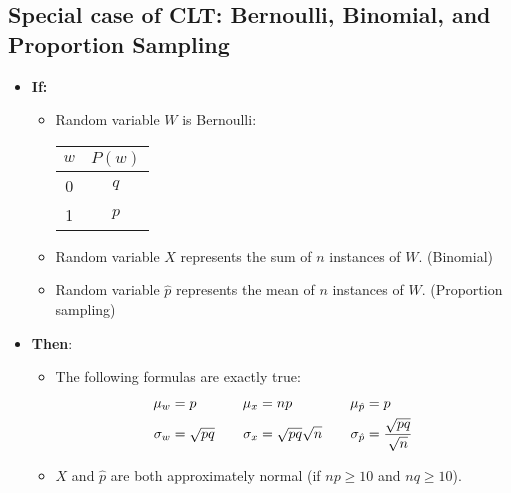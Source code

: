 \documentclass[12pt]{article}
\begin{document}
\subsection*{Special case of CLT: Bernoulli, Binomial, and Proportion Sampling}
\begin{itemize}
\item {\bf If:}
\begin{itemize}
\item Random variable $W$ is Bernoulli:
\begin{center}
\begin{tabular}{|c|c|}\hline
$w$ & $P(w)$ \\ \hline
0 & $q$ \\
1 & $p$ \\ \hline
\end{tabular}
\end{center} 
\item Random variable $X$ represents the sum of $n$ instances of $W$. (Binomial)
\item Random variable $\hat{p}$ represents the mean of $n$ instances of $W$. (Proportion sampling) 
\end{itemize}
\item {\bf Then}:
\begin{itemize}
\item The following formulas are exactly true:
\begin{align*}
\mu_{\tiny w} &= p &&&
\mu_{\tiny x} &= np &&&
\mu_{\tiny \hat{p}} &= p \\
\sigma_{\tiny w} &= \sqrt{pq} &&&
\sigma_{\tiny x} &= \sqrt{pq}\sqrt{n} &&&
\sigma_{\tiny \hat{p}} &= \frac{\sqrt{pq}}{\sqrt{n}} 
\end{align*}
\item $X$ and $\hat{p}$ are both approximately normal (if $np\ge 10$ and $nq \ge 10$).
\end{itemize}
\end{itemize}
\end{document}
